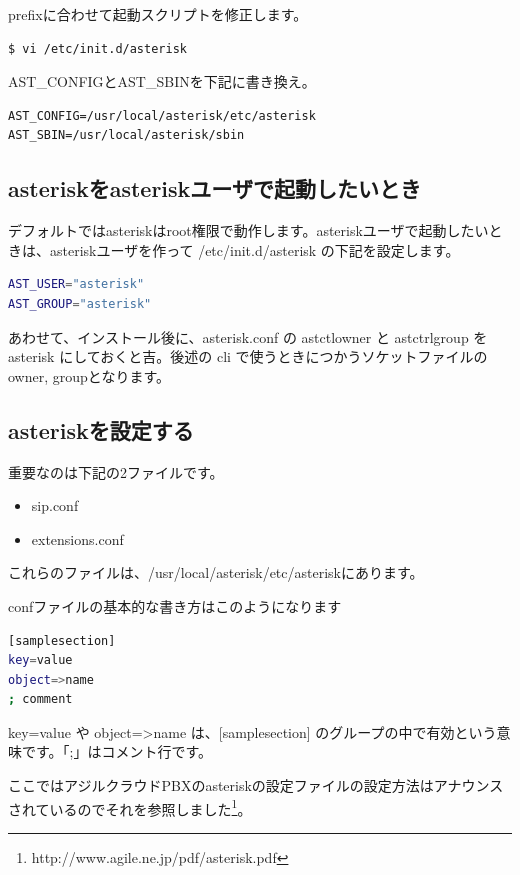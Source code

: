 prefixに合わせて起動スクリプトを修正します。

\begin{lstlisting}[language=bash]
$ vi /etc/init.d/asterisk
\end{lstlisting}

AST\_CONFIGとAST\_SBINを下記に書き換え。
\begin{lstlisting}
AST_CONFIG=/usr/local/asterisk/etc/asterisk
AST_SBIN=/usr/local/asterisk/sbin
\end{lstlisting}

\subsection{asteriskをasteriskユーザで起動したいとき}
デフォルトではasteriskはroot権限で動作します。asteriskユーザで起動したいときは、asteriskユーザを作って /etc/init.d/asterisk の下記を設定します。

\begin{lstlisting}[language=bash]
AST_USER="asterisk"
AST_GROUP="asterisk"
\end{lstlisting}

あわせて、インストール後に、asterisk.conf の astctlowner と astctrlgroup を asterisk にしておくと吉。後述の cli で使うときにつかうソケットファイルのowner, groupとなります。

\subsection{asteriskを設定する}
重要なのは下記の2ファイルです。
\begin{itemize}
\item sip.conf
\item extensions.conf
\end{itemize}
これらのファイルは、/usr/local/asterisk/etc/asteriskにあります。

confファイルの基本的な書き方はこのようになります

\begin{lstlisting}[language=bash]
[samplesection]
key=value
object=>name
; comment 
\end{lstlisting}

key=value や object=>name は、[samplesection] のグループの中で有効という意味です。「;」はコメント行です。

ここではアジルクラウドPBXのasteriskの設定ファイルの設定方法はアナウンスされているのでそれを参照しました\footnote{http://www.agile.ne.jp/pdf/asterisk.pdf}。

